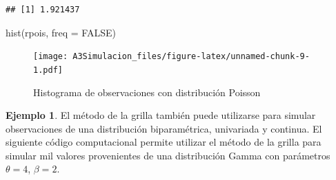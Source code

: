 \documentclass[
  10pt,
  spanish,
]{book}
\newenvironment{Shaded}{\begin{snugshade}}{\end{snugshade}}
\newcommand{\AttributeTok}[1]{\textcolor[rgb]{0.77,0.63,0.00}{#1}}
\newcommand{\ConstantTok}[1]{\textcolor[rgb]{0.00,0.00,0.00}{#1}}
\newcommand{\FunctionTok}[1]{\textcolor[rgb]{0.00,0.00,0.00}{#1}}
\newcommand{\NormalTok}[1]{#1}
\theoremstyle{definition}
\theoremstyle{definition}
\newtheorem{example}{Ejemplo}[chapter]
\theoremstyle{definition}
\theoremstyle{definition}
\theoremstyle{remark}
\begin{document}
\begin{verbatim}
## [1] 1.921437
\end{verbatim}

\begin{Shaded}
\begin{Highlighting}[]
\FunctionTok{hist}\NormalTok{(rpois, }\AttributeTok{freq =} \ConstantTok{FALSE}\NormalTok{)}
\end{Highlighting}
\end{Shaded}

\begin{figure}
\centering
\texttt{[image: A3Simulacion\_files/figure-latex/unnamed-chunk-9-1.pdf]}
\caption{\label{fig:unnamed-chunk-9}Histograma de observaciones con distribución Poisson}
\end{figure}

\begin{example}
\protect\hypertarget{exm:unnamed-chunk-10}{}{\label{exm:unnamed-chunk-10} }El método de la grilla también puede utilizarse para simular observaciones de una distribución biparamétrica, univariada y continua. El siguiente código computacional permite utilizar el método de la grilla para simular mil valores provenientes de una distribución Gamma con parámetros \(\theta = 4\), \(\beta = 2\).
\end{example}
\end{document}
